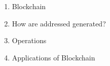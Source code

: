 \begin{enumerate}
  
  \item Blockchain
    
    
  \item How are addressed generated?
    

\newpage
  \item Operations
    
    
  \item Applications of Blockchain
    

\end{enumerate}

